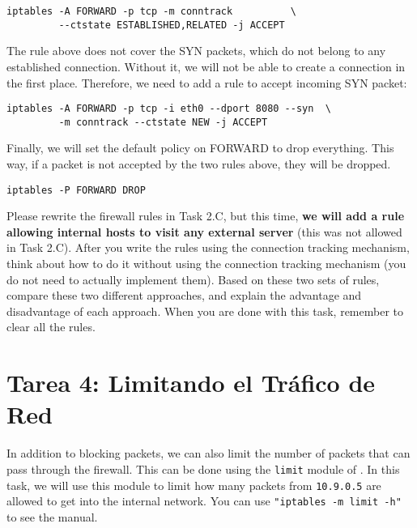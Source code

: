 \begin{lstlisting}
iptables -A FORWARD -p tcp -m conntrack          \
         --ctstate ESTABLISHED,RELATED -j ACCEPT
\end{lstlisting}


The rule above does not cover the SYN packets, which do not belong to 
any established connection. Without it, we will not be able to 
create a connection in the first place. Therefore, we need to 
add a rule to accept incoming SYN packet: 

\begin{lstlisting}
iptables -A FORWARD -p tcp -i eth0 --dport 8080 --syn  \
         -m conntrack --ctstate NEW -j ACCEPT 
\end{lstlisting}

Finally, we will set the default policy on FORWARD to drop
everything. This way, if a packet is not accepted by the two
rules above, they will be dropped. 

\begin{lstlisting}
iptables -P FORWARD DROP
\end{lstlisting}


Please rewrite the firewall rules in Task 2.C, but this time,
\textbf{we will add a rule allowing internal hosts to visit any 
external server} (this was not allowed in Task 2.C). 
After you write the rules using the connection tracking mechanism, 
think about how to do it without using the connection tracking
mechanism (you do not need to actually implement them). 
Based on these two sets of rules, 
compare these two different approaches, and 
explain the advantage and disadvantage of each approach. 
When you are done with this task, remember to clear all the rules. 



\section{Tarea 4: Limitando el Tráfico de Red}

In addition to blocking packets, we can also 
limit the number of packets that can pass through the firewall. 
This can be done using the \texttt{limit} module of \iptables.
In this task, we will use this module to limit how many packets 
from \texttt{10.9.0.5} are allowed to get into the internal network. 
You can use \texttt{"iptables -m limit -h"} to see the manual.  


